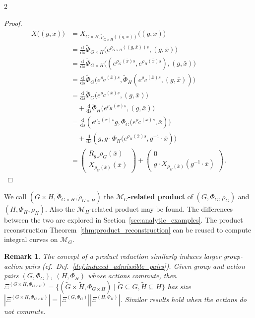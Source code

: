 \documentclass{article}
\newtheorem{proof}{Proof}[theorem]
\newtheorem{remark}[theorem]{Remark}
\newcommand{\M}{\mathcal{M}}                                %
\newcommand{\appX}{\bar{X}}
\newcommand{\appstate}{\bar{x}}
\newcommand{\ext}{\text{d}}                                 %
\newcommand{\pmat}[1]{\begin{pmatrix}#1\end{pmatrix}}
\begin{document}
\begin{multicols}{2}
\begin{proof}
    \begin{align*}
        \appX\big((g,\appstate)\big) &= X_{G\times H, \widetilde{\rho}_{G\times H}((g,\appstate))}\big((g,\appstate)\big) \\ 
        &= \frac{\ext}{\ext s} \widetilde{\Phi}_{G\times H}\big(e^{\widetilde{\rho}_{G\times H}((g,\appstate))s},(g,\appstate)\big) \\
        &= \frac{\ext}{\ext s} \widetilde{\Phi}_{G\times H}\big((e^{\rho_{G}(\appstate)s}, e^{\rho_{H}(\appstate)s}),(g,\appstate)\big) \\ 
        &= \frac{\ext}{\ext s} \widetilde{\Phi}_{G}\big(e^{\rho_{G}(\appstate)s},\widetilde{\Phi}_{H}(e^{\rho_{H}(\appstate)s},(g,\appstate))\big) \\
        &= \frac{\ext}{\ext s} \widetilde{\Phi}_{G}\big(e^{\rho_{G}(\appstate)s},(g,\appstate)\big) \\ 
        & \quad 
        + \frac{\ext}{\ext s} \widetilde{\Phi}_{H}\big(e^{\rho_{H}(\appstate)s},(g,\appstate)\big) \\
        &= \frac{\ext}{\ext s} (e^{\rho_{G}(\appstate)s} g, \Phi_{G}\big(e^{\rho_{G}(\appstate)s},\appstate)\big) \\ 
        & \quad + \frac{\ext}{\ext s} (g, g\cdot \Phi_{H}\big(e^{\rho_{H}(\appstate)s},g^{-1} \cdot \appstate)\big) \\
        &= 
        \pmat{ 
            {R_g}_*\rho_G(\appstate) \\ 
            X_{\rho_G(\appstate)}(\appstate)
        }
        +
        \pmat{ 0 \\
            g\cdot X_{\rho_H(\appstate)}(g^{-1}\cdot\appstate)
         } \,.
    \end{align*}
\end{proof}
We call $(G\times H, \widetilde{\Phi}_{G\times H}, \widetilde{\rho}_{G\times H})$ the \textbf{$\M_G$-related product} of $(G,\Phi_G,\rho_G)$ and $(H,\Phi_H,\rho_H)$. 
Also the $\M_H$-related product may be found. The differences between the two are explored in Section~\ref{sec:analytic_examples}. 
The product reconstruction Theorem~\ref{thm:product_reconstruction} can be reused to compute integral curves on $\M_G$.

\begin{remark}
    The concept of a product reduction similarly induces larger group-action pairs (cf.\ Def.~\ref{def:induced_admissible_pairs}). Given group and action pairs $(G,\Phi_G)$, $(H,\Phi_H)$ whose actions commute, then $\Xi^{(G\times H, \Phi_{G\times H})} = \{ (\widetilde{G}\times\widetilde{H}, \Phi_{G\times H})\;|\; \widetilde{G} \subseteq G, \widetilde{H} \subseteq H \}$ has size $|\Xi^{(G\times H, \Phi_{G\times H})}| = |\Xi^{(G, \Phi_{G})}| |\Xi^{(H, \Phi_{H})}|$. Similar results hold when the actions do not commute.
\end{remark}


\end{multicols}
\end{document}

